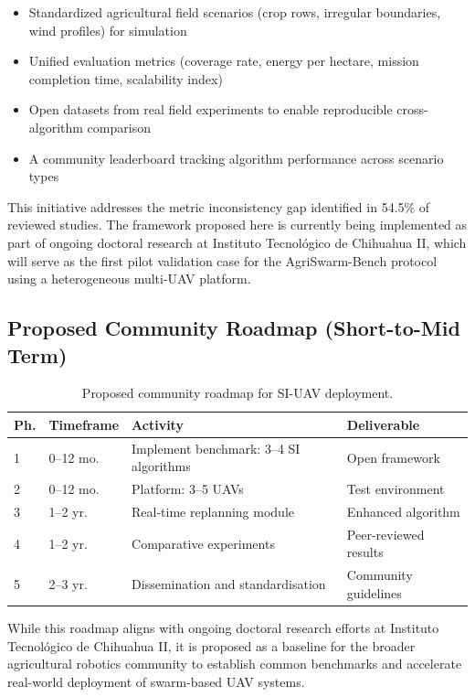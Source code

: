 \documentclass[review, 12pt, times]{elsarticle}
\begin{document}
\begin{itemize}
  \item Standardized agricultural field scenarios (crop
  rows, irregular boundaries, wind profiles) for simulation
  \item Unified evaluation metrics (coverage rate, energy
  per hectare, mission completion time, scalability index)
  \item Open datasets from real field experiments to enable
  reproducible cross-algorithm comparison
  \item A community leaderboard tracking algorithm
  performance across scenario types
\end{itemize}

This initiative addresses the metric inconsistency gap
identified in 54.5\% of reviewed studies. The framework
proposed here is currently being implemented as part of
ongoing doctoral research at Instituto Tecnológico de
Chihuahua II, which will serve as the first pilot
validation case for the AgriSwarm-Bench protocol using
a heterogeneous multi-UAV platform.

\subsection{Proposed Community Roadmap (Short-to-Mid Term)}

\begin{table}[htbp]
\centering
\caption{Proposed community roadmap for SI-UAV
deployment.}
\label{tab:roadmap}
\begin{tabularx}{\textwidth}{llXl}
\toprule
\textbf{Ph.} & \textbf{Timeframe} &
\textbf{Activity} & \textbf{Deliverable} \\
\midrule
1 & 0--12 mo. & Implement benchmark: 3--4 SI algorithms &
Open framework \\
2 & 0--12 mo. & Platform: 3--5 UAVs &
Test environment \\
3 & 1--2 yr.  & Real-time replanning module &
Enhanced algorithm \\
4 & 1--2 yr.  & Comparative experiments &
Peer-reviewed results \\
5 & 2--3 yr.  & Dissemination and standardisation &
Community guidelines \\
\bottomrule
\end{tabularx}
\end{table}

While this roadmap aligns with ongoing doctoral research
efforts at Instituto Tecnológico de Chihuahua II, it is
proposed as a baseline for the broader agricultural
robotics community to establish common benchmarks and
accelerate real-world deployment of swarm-based UAV
systems.
\end{document}
